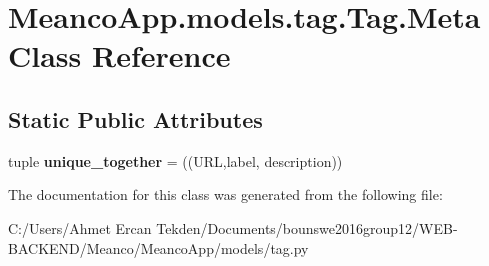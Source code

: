 \hypertarget{class_meanco_app_1_1models_1_1tag_1_1_tag_1_1_meta}{}\section{Meanco\+App.\+models.\+tag.\+Tag.\+Meta Class Reference}
\label{class_meanco_app_1_1models_1_1tag_1_1_tag_1_1_meta}
\subsection*{Static Public Attributes}
\begin{DoxyCompactItemize}
\item 
\hypertarget{class_meanco_app_1_1models_1_1tag_1_1_tag_1_1_meta_a223c0319f1f32b0fe112ef7165edd5e8}{}\label{class_meanco_app_1_1models_1_1tag_1_1_tag_1_1_meta_a223c0319f1f32b0fe112ef7165edd5e8} 
tuple {\bfseries unique\+\_\+together} = ((\textquotesingle{}U\+RL\textquotesingle{},\textquotesingle{}label\textquotesingle{}, \textquotesingle{}description\textquotesingle{}))
\end{DoxyCompactItemize}


The documentation for this class was generated from the following file\+:\begin{DoxyCompactItemize}
\item 
C\+:/\+Users/\+Ahmet Ercan Tekden/\+Documents/bounswe2016group12/\+W\+E\+B-\/\+B\+A\+C\+K\+E\+N\+D/\+Meanco/\+Meanco\+App/models/tag.\+py\end{DoxyCompactItemize}
